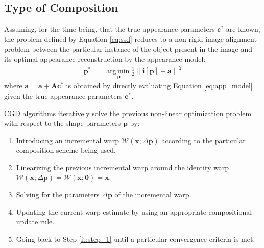 \subsection{Type of Composition}
\label{sec:composition}

Assuming, for the time being, that the true appearance parameters $\mathbf{c}^*$ are known, the problem defined by Equation \ref{eq:ssd} reduces to a non-rigid image alignment problem \cite{Baker2004, Munoz2014} between the particular instance of the object present in the image and its optimal appearance reconstruction by the appearance model:
\begin{equation}
    \begin{aligned}
        \mathbf{p}^* & = \underset{\mathbf{p}}{\mathrm{arg\,min\;}} 
        \frac{1}{2}\left\| \mathbf{i}[\mathbf{p}] - \mathbf{a} \right\|^2 
    \label{eq:ssd_shape}
    \end{aligned}
\end{equation}
where $\mathbf{a} = \bar{\mathbf{a}} + \mathbf{A} \mathbf{c}^*$ is obtained by directly evaluating Equation \ref{eq:app_model} given the true appearance parameters $\mathbf{c}^*$.

CGD algorithms iteratively solve the previous non-linear optimization problem with respect to the shape parameters $\mathbf{p}$ by:
\begin{enumerate}
    \item Introducing an incremental warp $\mathcal{W}(\mathbf{x}; \Delta\mathbf{p})$ according to the particular composition scheme being used.
    \label{it:step_1}
    
    \item Linearizing the previous incremental warp around the identity warp $\mathcal{W}(\mathbf{x}; \Delta\mathbf{p}) = \mathcal{W}(\mathbf{x}; \mathbf{0}) = \mathbf{x}$.
    \label{it:step_2}
    
    \item Solving for the parameters $\Delta\mathbf{p}$ of the incremental warp.
    \label{it:step_3}

    \item Updating the current warp estimate by using an appropriate compositional update rule.
    \label{it:step_4}

    \item Going back to Step \ref{it:step_1} until a particular convergence criteria is met.
    \label{it:step_5}
\end{enumerate}


